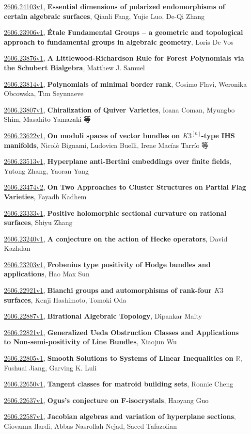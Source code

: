 \documentclass[9pt, a4paper]{article}
\theoremstyle{plain}
\theoremstyle{definition}
\theoremstyle{remark}
\newcommand{\arxiv}[3]{\href{https://arxiv.org/abs/#1}{#1}, \textbf{\textcolor{arxivblue}{#2}}, #3}
\begin{document}
\arxiv{2606.24103v1}{Essential dimensions of polarized endomorphisms of certain algebraic surfaces}{Qianli Fang, Yujie Luo, De-Qi Zhang}

\arxiv{2606.23906v1}{Étale Fundamental Groups -- a geometric and topological approach to fundamental groups in algebraic geometry}{Loris De Vos}

\arxiv{2606.23876v1}{A Littlewood-Richardson Rule for Forest Polynomials via the Schubert Bialgebra}{Matthew J. Samuel}

\arxiv{2606.23814v1}{Polynomials of minimal border rank}{Cosimo Flavi, Weronika Obcowska, Tim Seynnaeve}

\arxiv{2606.23807v1}{Chiralization of Quiver Varieties}{Ioana Coman, Myungbo Shim, Masahito Yamazaki 等}

\arxiv{2606.23622v1}{On moduli spaces of vector bundles on $K3^{[n]}$-type IHS manifolds}{Nicolò Bignami, Ludovica Buelli, Irene Macías Tarrío 等}

\arxiv{2606.23513v1}{Hyperplane anti-Bertini embeddings over finite fields}{Yutong Zhang, Yaoran Yang}

\arxiv{2606.23474v2}{On Two Approaches to Cluster Structures on Partial Flag Varieties}{Fayadh Kadhem}

\arxiv{2606.23333v1}{Positive holomorphic sectional curvature on rational surfaces}{Shiyu Zhang}

\arxiv{2606.23240v1}{A conjecture on the action of Hecke operators}{David Kazhdan}

\arxiv{2606.23203v1}{Frobenius type positivity of Hodge bundles and applications}{Hao Max Sun}

\arxiv{2606.22921v1}{Bianchi groups and automorphisms of rank-four $K3$ surfaces}{Kenji Hashimoto, Tomoki Oda}

\arxiv{2606.22887v1}{Birational Algebraic Topology}{Dipankar Maity}

\arxiv{2606.22821v1}{Generalized Ueda Obstruction Classes and Applications to Non-semi-positivity of Line Bundles}{Xiaojun Wu}

\arxiv{2606.22805v1}{Smooth Solutions to Systems of Linear Inequalities on $\mathbb{R}$}{Fushuai Jiang, Garving K. Luli}

\arxiv{2606.22650v1}{Tangent classes for matroid building sets}{Ronnie Cheng}

\arxiv{2606.22637v1}{Ogus's conjecture on F-isocrystals}{Haoyang Guo}

\arxiv{2606.22587v1}{Jacobian algebras and variation of hyperplane sections}{Giovanna Ilardi, Abbas Nasrollah Nejad, Saeed Tafazolian}
\end{document}
